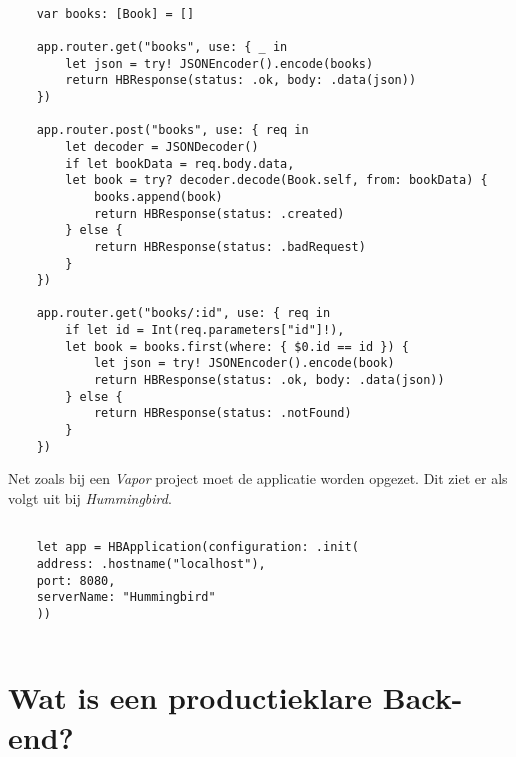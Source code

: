 \begin{lstlisting}[caption=Himmingbird example - Routes]

    var books: [Book] = []
    
    app.router.get("books", use: { _ in
        let json = try! JSONEncoder().encode(books)
        return HBResponse(status: .ok, body: .data(json))
    })
    
    app.router.post("books", use: { req in
        let decoder = JSONDecoder()
        if let bookData = req.body.data,
        let book = try? decoder.decode(Book.self, from: bookData) {
            books.append(book)
            return HBResponse(status: .created)
        } else {
            return HBResponse(status: .badRequest)
        }
    })
    
    app.router.get("books/:id", use: { req in
        if let id = Int(req.parameters["id"]!),
        let book = books.first(where: { $0.id == id }) {
            let json = try! JSONEncoder().encode(book)
            return HBResponse(status: .ok, body: .data(json))
        } else {
            return HBResponse(status: .notFound)
        }
    })
\end{lstlisting}

Net zoals bij een \textit{Vapor} project moet de applicatie worden opgezet. Dit ziet er als volgt uit bij \textit{Hummingbird}. 

\begin{lstlisting}[caption=Himmingbird example - Service]
    
    let app = HBApplication(configuration: .init(
    address: .hostname("localhost"),
    port: 8080,
    serverName: "Hummingbird"
    ))
   
\end{lstlisting}

\newpage
\section{Wat is een productieklare Back-end?}

